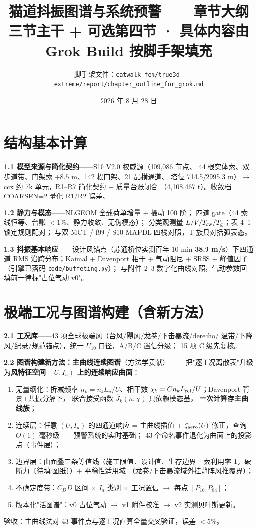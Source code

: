 \documentclass[11pt,a4paper]{ctexart}
\title{\bfseries 猫道抖振图谱与系统预警——章节大纲\\
\large 三节主干 + 可选第四节 · 具体内容由 Grok Build 按脚手架填充}
\author{脚手架文件：\texttt{catwalk-fem/true3d-extreme/report/chapter\_outline\_for\_grok.md}}
\date{2026 年 8 月 28 日}
\newcommand{\tofill}[1]{\textcolor{red!60!black}{〔待填:#1〕}}
\begin{document}
\maketitle

\noindent{}

\section{结构基本计算}

\textbf{1.1 模型来源与简化契约}——S10 V2.0 权威源（109{,}086 节点、
44 根实体索、双步道带、门架索 $+8.5$ m、142 榀门架、21 品横通道、
塔位 714.5/2995.3 m）$\to$ ccx 约 7k 单元，R1--R7 简化契约 + 质量台账闭合
（4{,}108.467 t）。收敛档 COARSEN=2 量化 R1/R2 误差。

\textbf{1.2 静力与模态}——NLGEOM 全载荷单增量 + 摄动 100 阶；
四道 gate（44 索线恒等、台账 $<1\%$、静力收敛、无伪模态）；
分类观测量 $L/V/T_{\rm cw}/T_{\rm g}$；表 4--1 锁定规则配对；
与双 MCT / f99 / S10-MAPDL 四栈对照，T 族只对括弧表态。

\textbf{1.3 抖振基本响应}——设计风锚点（苏通桥位实测百年 10-min
\textbf{38.9 m/s}）下四通道 RMS 沿跨分布；Kaimal + Davenport 相干 +
气动阻尼 + SRSS + 峰值因子（引擎已落码 \texttt{code/buffeting.py}）；
与附件 2--3 数字化曲线对照。气动参数回填前一律标"占位气动 v0"。

\section{极端工况与图谱构建（含新方法）}

\textbf{2.1 工况库}——43 项全球极端风（台风/飓风/龙卷/下击暴流/derecho/
温带/下降风/纪录/规范锚点），统一 $U_{10}$ 口径，A/B/C 置信分级；
15 项 C 级先复核。

\textbf{2.2 图谱构建新方法：主曲线连续图谱}（方法学贡献）——
把"逐工况离散表"升级为\textbf{风特征空间 $(U, I_u)$ 上的连续响应曲面}：
\begin{enumerate}
  \item 无量纲化：折减频率 $\tilde n_k = n_k L_u/U$、相干数
        $\chi_k = C n_k L_{\rm ref}/U$；Davenport 背景+共振分解下，
        联合接受函数 $\hat J_k(\tilde n,\chi)$ 只依赖模态基，
        \textbf{一次计算存主曲线族}；
  \item 连续层：任意 $(U,I_u)$ 的四通道响应 = 主曲线插值 +
        $\zeta_{\rm aero}(U)$ 修正，查询 $O(1)$ 毫秒级——预警系统的实时基础；
        43 个命名事件退化为曲面上的投影点（事件层）；
  \item 边界层：曲面叠三条等值线（施工限值、设计值、生存边界
        =索利用率 1，破断力\tofill{图纸}）+ 平稳性适用域
        （龙卷/下击暴流域外挂静阵风推覆界）；
  \item 不确定度带：$C_D D$ 区间 $\times$ $I_u$ 类别 $\times$ 工况置信
        $\to$ 每点 $[P_{16},P_{84}]$；
  \item 版本化"活图谱"：v0 占位气动 $\to$ v1 附件校准 $\to$ v2 实测贝叶斯更新。
\end{enumerate}
验收：主曲线法对 43 事件点与逐工况直算全量交叉验证，误差 $<5\%$。
\end{document}

